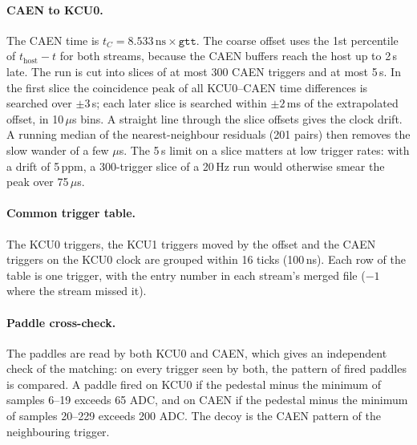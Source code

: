 \documentclass[11pt]{article}
\begin{document}
\paragraph{CAEN to KCU0.} The CAEN time is $t_C = 8.533\,\mathrm{ns} \times \mathtt{gtt}$. The coarse offset
uses the 1st percentile of $t_\mathrm{host} - t$ for both streams, because the CAEN buffers reach the host up
to 2\,s late. The run is cut into slices of at most 300 CAEN triggers and at most 5\,s. In the first slice the
coincidence peak of all KCU0--CAEN time differences is searched over $\pm 3$\,s; each later slice is searched
within $\pm 2$\,ms of the extrapolated offset, in 10\,$\mu$s bins. A straight line through the slice offsets
gives the clock drift. A running median of the nearest-neighbour residuals (201 pairs) then removes the slow
wander of a few $\mu$s. The 5\,s limit on a slice matters at low trigger rates: with a drift of 5\,ppm, a
300-trigger slice of a 20\,Hz run would otherwise smear the peak over 75\,$\mu$s.

\paragraph{Common trigger table.} The KCU0 triggers, the KCU1 triggers moved by the offset and the CAEN
triggers on the KCU0 clock are grouped within 16 ticks (100\,ns). Each row of the table is one trigger,
with the entry number in each stream's merged file ($-1$ where the stream missed it).

\paragraph{Paddle cross-check.} The paddles are read by both KCU0 and CAEN, which gives an independent check
of the matching: on every trigger seen by both, the pattern of fired paddles is compared. A paddle fired on
KCU0 if the pedestal minus the minimum of samples 6--19 exceeds 65 ADC, and on CAEN if the pedestal minus the
minimum of samples 20--229 exceeds 200 ADC. The decoy is the CAEN pattern of the neighbouring trigger.
\end{document}
